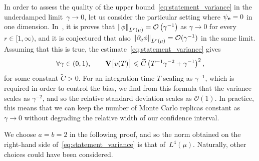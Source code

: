 \documentclass[11pt,a4paper]{article}
\begin{document}
\begin{remark}
    In order to assess the quality of the upper bound~\eqref{eq:statement_variance} in the underdamped limit~$\gamma \to 0$,
    let us consider the particular setting where $\psi_{\boldsymbol{\mathbf e}} = 0$ in one dimension.
    In~\cite[Remark 6.10]{MR2394704},
    it is proves that $\norm{\phi}[\lp{r}{\mu}] = \bigo{\gamma^{-1}}$ as $\gamma \to 0$ for every $r \in [1, \infty)$,
    and it is conjectured that also $\norm{\partial_q \phi}[\lp{r}{\mu}] = \mathcal O(\gamma^{-1})$ in the same limit.
    Assuming that this is true, the estimate~\eqref{eq:statement_variance} gives
    \begin{equation}
        \label{eq:variance_scaling}
        \forall \gamma \in (0, 1), \qquad
        \mathbf{V} \bigl[v(T)\bigr]
        \leqslant \widetilde C \left( T^{-1} \gamma^{-2} + \gamma^{-1} \right)^2,
    \end{equation}
    for some constant $\widetilde C > 0$.
    For an integration time $T$ scaling as $\gamma^{-1}$,
    which is required in order to control the bias,
    we find from this formula that the variance scales as $\gamma^{-2}$,
    and so the relative standard deviation scales as $\mathcal O(1)$.
    In practice, this means that we can keep the number of Monte Carlo replicas constant as $\gamma \to 0$
    without degrading the relative width of our confidence interval.
\end{remark}
\begin{remark}
    We choose $a = b = 2$ in the following proof,
    and so the norm obtained on the right-hand side of~\eqref{eq:statement_variance} is that of~$L^4(\mu)$.
    Naturally, other choices could have been considered.
\end{remark}
\end{document}
